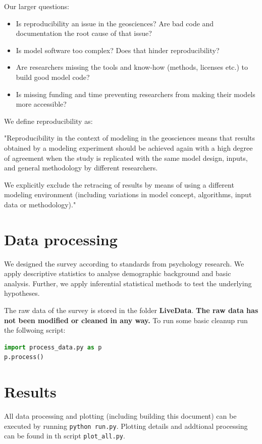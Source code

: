 \documentclass{article}
\begin{document}
Our larger questions:
\begin{itemize}
	\item Is reproducibility an issue in the geosciences? Are bad code and documentation the root cause of that issue?
	\item Is model software too complex? Does that hinder reproducibility?
	\item Are researchers missing the tools and know-how (methods, licenses etc.) to build good model code?
	\item Is missing funding and time preventing researchers from making their models more accessible?
\end{itemize}

We define reproducibility as:

"Reproducibility in the context of modeling in the geosciences means that results obtained by a modeling experiment should be achieved again with a high degree of agreement when the study is replicated with the same model design, inputs, and general methodology by different researchers.

We explicitly exclude the retracing of results by means of using a different modeling environment (including variations in model concept, algorithms, input data or methodology)."

\section{Data processing}
We designed the survey according to standards from psychology research. We apply descriptive statistics to analyse demographic background and basic analysis.
Further, we apply inferential statistical methods to test the underlying hypotheses.

The raw data of the survey is stored in the folder \textbf{LiveData}. \textbf{The raw data has not been modified or cleaned in any way.}
To run some basic cleanup run the follwoing script: 

\begin{lstlisting}[language=Python]
import process_data.py as p
p.process()
\end{lstlisting}

\section{Results}
All data processing and plotting (including building this document) can be executed by running \lstinline{python run.py}.
Plotting details and addtional processing can be found in th script \lstinline{plot_all.py}.
\end{document}
